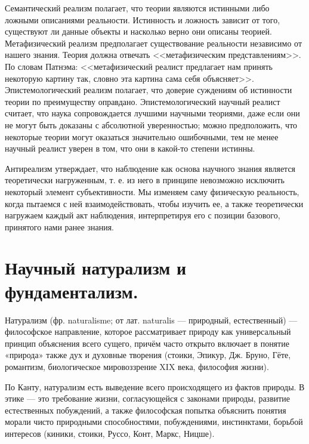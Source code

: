 \documentclass[12pt, specialist, subf, substylefile = spbu.rtx]{disser}
\begin{document}
Семантический реализм полагает, что теории являются истинными либо ложными описаниями реальности. Истинность и ложность зависит от того, существуют ли данные объекты и насколько верно они описаны теорией.
Метафизический реализм предполагает существование реальности независимо от нашего знания. Теория должна отвечать <<метафизическим представлениям>>. По словам Патнэма: <<метафизический реалист предлагает нам принять некоторую картину так, словно эта картина сама себя объясняет>>.
Эпистемологический реализм полагает, что доверие суждениям об истинности теории по преимуществу оправдано. Эпистемологический научный реалист считает, что наука сопровождается лучшими научными теориями, даже если они не могут быть доказаны с абсолютной уверенностью; можно предположить, что некоторые теории могут оказаться значительно ошибочными, тем не менее научный реалист уверен в том, что они в какой-то степени истинны.

Антиреализм утверждает, что наблюдение как основа научного знания является теоретически нагруженным, т. е. из него в принципе невозможно исключить некоторый элемент субъективности. Мы изменяем саму физическую реальность, когда пытаемся с ней взаимодействовать, чтобы изучить ее, а также теоретически нагружаем каждый акт наблюдения, интерпретируя его с позиции базового, принятого нами ранее знания.

\section{Научный натурализм и фундаментализм.}
Натурализм (фр. naturalisme; от лат. naturalis — природный, естественный) — философское направление, которое рассматривает природу как универсальный принцип объяснения всего сущего, причём часто открыто включает в понятие «природа» также дух и духовные творения (стоики, Эпикур, Дж. Бруно, Гёте, романтизм, биологическое мировоззрение XIX века, философия жизни).

По Канту, натурализм есть выведение всего происходящего из фактов природы. В этике — это требование жизни, согласующейся с законами природы, развитие естественных побуждений, а также философская попытка объяснить понятия морали чисто природными способностями, побуждениями, инстинктами, борьбой интересов (киники, стоики, Руссо, Конт, Маркс, Ницше).
\end{document}
